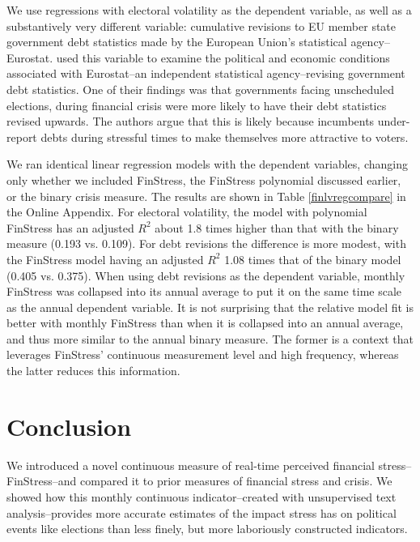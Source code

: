 \documentclass[]{article}
\begin{document}
We use regressions with electoral volatility as the dependent variable, as well as a substantively very different variable: cumulative revisions to EU member state government debt statistics made by the European Union's statistical agency--Eurostat. \cite{gandrudHallerbergJEPP} used this variable to examine the political and economic conditions associated with Eurostat--an independent statistical agency--revising government debt statistics. One of their findings was that governments facing unscheduled elections, during financial crisis were more likely to have their debt statistics revised upwards. The authors argue that this is likely because incumbents under-report debts during stressful times to make themselves more attractive to voters.

We ran identical linear regression models with the dependent variables, changing only whether we included FinStress, the FinStress polynomial discussed earlier, or the binary crisis measure. The results are shown in Table \ref{finlvregcompare} in the Online Appendix. For electoral volatility, the model with polynomial FinStress has an adjusted $R^2$ about 1.8 times higher than that with the binary measure (0.193 vs. 0.109). For debt revisions the difference is more modest, with the FinStress model having an adjusted $R^2$ 1.08 times that of the binary model (0.405 vs. 0.375). When using debt revisions as the dependent variable, monthly FinStress was collapsed into its annual average to put it on the same time scale as the annual dependent variable. It is not surprising that the relative model fit is better with monthly FinStress than when it is collapsed into an annual average, and thus more similar to the annual binary measure. The former is a context that leverages FinStress' continuous measurement level and high frequency, whereas the latter reduces this information.

\section{Conclusion}\label{conclusion}

We introduced a novel continuous measure of real-time perceived financial stress--FinStress--and compared it to prior measures of financial stress and crisis. We showed how this monthly continuous indicator--created with unsupervised text analysis--provides more accurate estimates of the impact stress has on political events like elections than less finely, but more laboriously constructed indicators.
\end{document}
